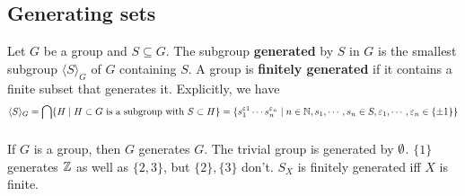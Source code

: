 \subsection{Generating sets}
\begin{definition}[]
    Let $G$ be a group and $S \subseteq G$. The subgroup \textbf{generated} by $S$ in $G$ is the smallest subgroup $\langle S \rangle _G$ of $G$ containing $S$. A group is \textbf{finitely generated} if it contains a finite subset that generates it. Explicitly, we have \[
    \langle S \rangle _G = \bigcap_{ } \{H \mid  H \subset  G \text{ is a subgroup with } S \subset H\} = \{s_1 ^{\varepsilon 1}\cdots s_n  ^{\varepsilon _n }\mid  n \in \mathbb{N}, s_1, \cdots ,s_n  \in S, \varepsilon_1, \cdots ,\varepsilon _n \in \{\pm 1\} \} 
    \] 
\end{definition}
\begin{example}
    If $G$ is a group, then $G$ generates $G$. The trivial group is generated by $\emptyset$. $\{1\} $ generates $\mathbb{Z}$ as well as $\{2,3\} $, but $\{2\} , \{3\} $ don't. $S_X$ is finitely generated iff $X$ is finite.
\end{example}

